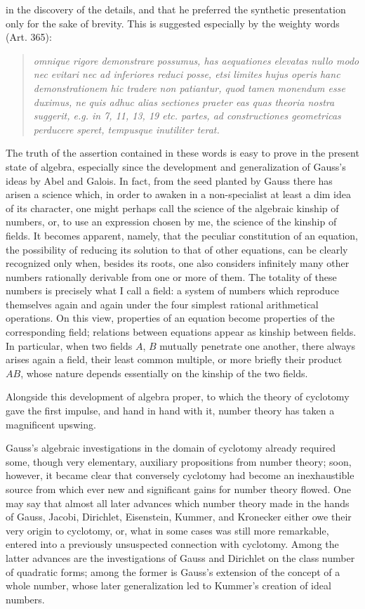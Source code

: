 \documentclass[11pt]{article}
\newcommand{\origpage}[1]{\par\vspace{0.25em}\noindent{\footnotesize\itshape [Printed page #1]}\par\vspace{0.25em}}
\begin{document}
\origpage{409}
in the discovery of the details, and that he preferred the synthetic presentation only for the sake of brevity. This is suggested especially by the weighty words (Art. 365):
\begin{quote}\itshape
omnique rigore demonstrare possumus, has aequationes elevatas nullo modo nec evitari nec ad inferiores reduci posse, etsi limites hujus operis hanc demonstrationem hic tradere non patiantur, quod tamen monendum esse duximus, ne quis adhuc alias sectiones praeter eas quas theoria nostra suggerit, e.g. in 7, 11, 13, 19 etc. partes, ad constructiones geometricas perducere speret, tempusque inutiliter terat.
\end{quote}
The truth of the assertion contained in these words is easy to prove in the present state of algebra, especially since the development and generalization of Gauss's ideas by Abel and Galois. In fact, from the seed planted by Gauss there has arisen a science which, in order to awaken in a non-specialist at least a dim idea of its character, one might perhaps call the science of the algebraic kinship of numbers, or, to use an expression chosen by me, the science of the kinship of fields. It becomes apparent, namely, that the peculiar constitution of an equation, the possibility of reducing its solution to that of other equations, can be clearly recognized only when, besides its roots, one also considers infinitely many other numbers rationally derivable from one or more of them. The totality of these numbers is precisely what I call a field: a system of numbers which reproduce themselves again and again under the four simplest rational arithmetical operations. On this view, properties of an equation become properties of the corresponding field; relations between equations appear as kinship between fields. In particular, when two fields $A$, $B$ mutually penetrate one another, there always arises again a field, their least common multiple, or more briefly their product $AB$, whose nature depends essentially on the kinship of the two fields.

Alongside this development of algebra proper, to which the theory of cyclotomy gave the first impulse, and hand in hand with it, number theory has taken a magnificent upswing.

\origpage{410}
Gauss's algebraic investigations in the domain of cyclotomy already required some, though very elementary, auxiliary propositions from number theory; soon, however, it became clear that conversely cyclotomy had become an inexhaustible source from which ever new and significant gains for number theory flowed. One may say that almost all later advances which number theory made in the hands of Gauss, Jacobi, Dirichlet, Eisenstein, Kummer, and Kronecker either owe their very origin to cyclotomy, or, what in some cases was still more remarkable, entered into a previously unsuspected connection with cyclotomy. Among the latter advances are the investigations of Gauss and Dirichlet on the class number of quadratic forms; among the former is Gauss's extension of the concept of a whole number, whose later generalization led to Kummer's creation of ideal numbers.
\end{document}
